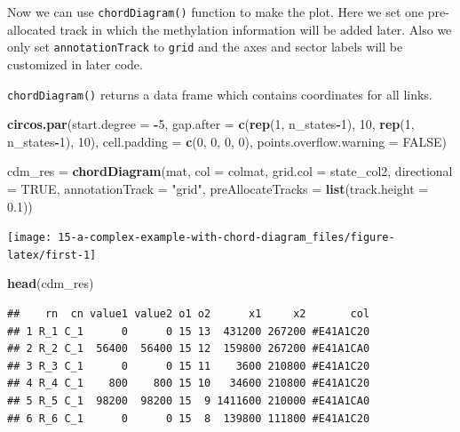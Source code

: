 \documentclass[]{book}
\newenvironment{Shaded}{\begin{snugshade}}{\end{snugshade}}
\newcommand{\KeywordTok}[1]{\textcolor[rgb]{0.13,0.29,0.53}{\textbf{#1}}}
\newcommand{\DataTypeTok}[1]{\textcolor[rgb]{0.13,0.29,0.53}{#1}}
\newcommand{\DecValTok}[1]{\textcolor[rgb]{0.00,0.00,0.81}{#1}}
\newcommand{\FloatTok}[1]{\textcolor[rgb]{0.00,0.00,0.81}{#1}}
\newcommand{\StringTok}[1]{\textcolor[rgb]{0.31,0.60,0.02}{#1}}
\newcommand{\OtherTok}[1]{\textcolor[rgb]{0.56,0.35,0.01}{#1}}
\newcommand{\OperatorTok}[1]{\textcolor[rgb]{0.81,0.36,0.00}{\textbf{#1}}}
\newcommand{\NormalTok}[1]{#1}
\begin{document}
Now we can use \texttt{chordDiagram()} function to make the plot. Here
we set one pre-allocated track in which the methylation information will
be added later. Also we only set \texttt{annotationTrack} to
\texttt{grid} and the axes and sector labels will be customized in later
code.

\texttt{chordDiagram()} returns a data frame which contains coordinates
for all links.

\begin{Shaded}
\begin{Highlighting}[]
\KeywordTok{circos.par}\NormalTok{(}\DataTypeTok{start.degree =} \OperatorTok{-}\DecValTok{5}\NormalTok{, }\DataTypeTok{gap.after =} \KeywordTok{c}\NormalTok{(}\KeywordTok{rep}\NormalTok{(}\DecValTok{1}\NormalTok{, n_states}\OperatorTok{-}\DecValTok{1}\NormalTok{), }\DecValTok{10}\NormalTok{, }\KeywordTok{rep}\NormalTok{(}\DecValTok{1}\NormalTok{, n_states}\OperatorTok{-}\DecValTok{1}\NormalTok{), }\DecValTok{10}\NormalTok{),}
    \DataTypeTok{cell.padding =} \KeywordTok{c}\NormalTok{(}\DecValTok{0}\NormalTok{, }\DecValTok{0}\NormalTok{, }\DecValTok{0}\NormalTok{, }\DecValTok{0}\NormalTok{), }\DataTypeTok{points.overflow.warning =} \OtherTok{FALSE}\NormalTok{)}

\NormalTok{cdm_res =}\StringTok{ }\KeywordTok{chordDiagram}\NormalTok{(mat, }\DataTypeTok{col =}\NormalTok{ colmat, }\DataTypeTok{grid.col =}\NormalTok{ state_col2,}
    \DataTypeTok{directional =} \OtherTok{TRUE}\NormalTok{, }\DataTypeTok{annotationTrack =} \StringTok{"grid"}\NormalTok{, }
    \DataTypeTok{preAllocateTracks =} \KeywordTok{list}\NormalTok{(}\DataTypeTok{track.height =} \FloatTok{0.1}\NormalTok{))}
\end{Highlighting}
\end{Shaded}

\begin{center}\texttt{[image: 15-a-complex-example-with-chord-diagram\_files/figure-latex/first-1]} \end{center}

\begin{Shaded}
\begin{Highlighting}[]
\KeywordTok{head}\NormalTok{(cdm_res)}
\end{Highlighting}
\end{Shaded}

\begin{verbatim}
##    rn  cn value1 value2 o1 o2      x1     x2       col
## 1 R_1 C_1      0      0 15 13  431200 267200 #E41A1C20
## 2 R_2 C_1  56400  56400 15 12  159800 267200 #E41A1CA0
## 3 R_3 C_1      0      0 15 11    3600 210800 #E41A1C20
## 4 R_4 C_1    800    800 15 10   34600 210800 #E41A1C20
## 5 R_5 C_1  98200  98200 15  9 1411600 210000 #E41A1CA0
## 6 R_6 C_1      0      0 15  8  139800 111800 #E41A1C20
\end{verbatim}
\end{document}
